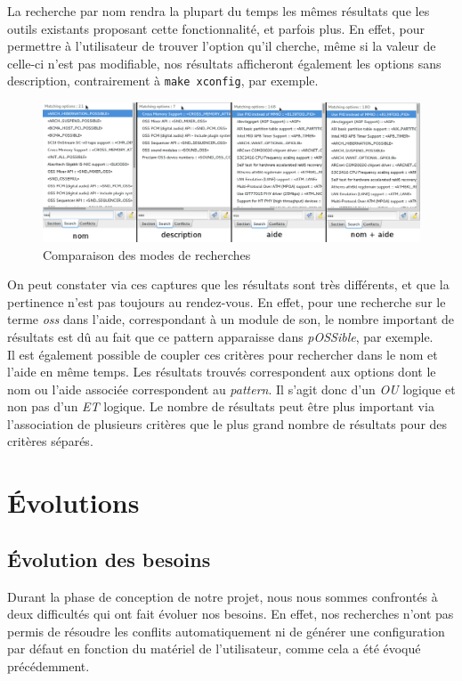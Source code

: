 ﻿\documentclass[17pts]{report}
\begin{document}
La recherche par nom rendra la plupart du temps les mêmes résultats que les
outils existants proposant cette fonctionnalité, et parfois plus. En effet,
pour permettre à l'utilisateur de trouver l'option qu'il cherche, même si la
valeur de celle-ci n'est pas modifiable, nos résultats afficheront également
les options sans description, contrairement à \verb|make xconfig|, par
exemple.\\

\begin{figure}[H]
    \includegraphics[scale=0.4]{./illustrations/search_cmp.png}
    \centering
    \caption{Comparaison des modes de recherches}
    \label{fig:ModesDeRecherche}
\end{figure}

On peut constater via ces captures que les résultats sont très différents, et
que la pertinence n'est pas toujours au rendez-vous. En effet, pour une
recherche sur le terme \textit{oss} dans l'aide, correspondant à un module de
son, le nombre important de résultats est dû au fait que ce pattern apparaisse
dans \textit{pOSSible}, par exemple.\\

Il est également possible de coupler ces critères pour rechercher dans le nom
et l'aide en même temps. Les résultats trouvés correspondent aux options dont
le nom ou l'aide associée correspondent au \textit{pattern}. Il s'agit donc d'un
\textit{OU} logique et non pas d'un \textit{ET} logique. Le nombre de résultats
peut être plus important via l'association de plusieurs critères que le plus
grand nombre de résultats pour des critères séparés.\\

\section{Évolutions}
\label{sec:Évolutions}
\subsection{Évolution des besoins}
\label{sub:Évolution des besoins}
Durant la phase de conception de notre projet, nous nous sommes confrontés à
deux difficultés qui ont fait évoluer nos besoins. En effet, nos recherches
n'ont pas permis de résoudre les conflits automatiquement ni de générer une
configuration par défaut en fonction du matériel de l'utilisateur, comme cela a
été évoqué précédemment.  \\
\end{document}
